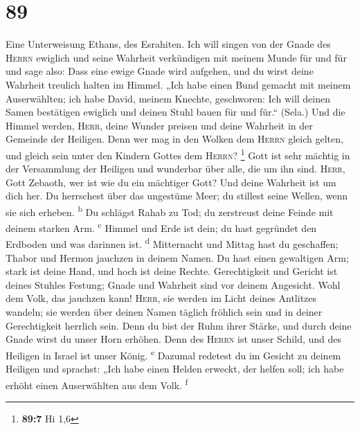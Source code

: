 \hypertarget{section-88}{%
\section{89}\label{section-88}}

 Eine Unterweisung Ethans, des Esrahiten. 
Ich will singen von der Gnade des \textsc{Herrn} ewiglich und seine
Wahrheit verkündigen mit meinem Munde für und für  und
sage also: Dass eine ewige Gnade wird aufgehen, und du wirst deine
Wahrheit treulich halten im Himmel.  „Ich habe einen Bund
gemacht mit meinem Auserwählten; ich habe David, meinem Knechte,
geschworen:  Ich will deinen Samen bestätigen ewiglich und
deinen Stuhl bauen für und für.`` (Sela.)  Und die Himmel
werden, \textsc{Herr}, deine Wunder preisen und deine Wahrheit in der
Gemeinde der Heiligen.  Denn wer mag in den Wolken dem
\textsc{Herrn} gleich gelten, und gleich sein unter den Kindern Gottes
dem \textsc{Herrn}? \footnote{\textbf{89:7} Hi 1,6}  Gott
ist sehr mächtig in der Versammlung der Heiligen und wunderbar über
alle, die um ihn sind.  \textsc{Herr}, Gott Zebaoth, wer
ist wie du ein mächtiger Gott? Und deine Wahrheit ist um dich her.
 Du herrschest über das ungestüme Meer; du stillest seine
Wellen, wenn sie sich erheben. \textsuperscript{b}  Du
schlägst Rahab zu Tod; du zerstreust deine Feinde mit deinem starken
Arm. \textsuperscript{c}  Himmel und Erde ist dein; du
hast gegründet den Erdboden und was darinnen ist. \textsuperscript{d}
 Mitternacht und Mittag hast du geschaffen; Thabor und
Hermon jauchzen in deinem Namen.  Du hast einen
gewaltigen Arm; stark ist deine Hand, und hoch ist deine Rechte.
 Gerechtigkeit und Gericht ist deines Stuhles Festung;
Gnade und Wahrheit sind vor deinem Angesicht.  Wohl dem
Volk, das jauchzen kann! \textsc{Herr}, sie werden im Licht deines
Antlitzes wandeln;  sie werden über deinen Namen täglich
fröhlich sein und in deiner Gerechtigkeit herrlich sein. 
Denn du bist der Ruhm ihrer Stärke, und durch deine Gnade wirst du unser
Horn erhöhen.  Denn des \textsc{Herrn} ist unser Schild,
und des Heiligen in Israel ist unser König. \textsuperscript{e}
 Dazumal redetest du im Gesicht zu deinem Heiligen und
sprachst: „Ich habe einen Helden erweckt, der helfen soll; ich habe
erhöht einen Auserwählten aus dem Volk. \textsuperscript{f}
